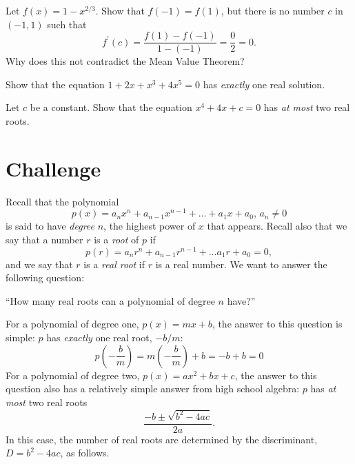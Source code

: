\documentclass[10pt]{amsart}
\begin{document}
\vspace{1.5in}

\begin{thm}
  Let \(f(x) = 1 - x^{2/3}\).
  Show that \(f(-1) = f(1)\), but there is no number \(c\) in \((-1,1)\) such that
  \[f^\prime(c) = \frac{f(1) - f(-1)}{1 - (-1)} = \frac{0}{2} = 0.\]
  Why does this not contradict the Mean Value Theorem?
\end{thm}

\newpage

\begin{thm}
  Show that the equation \(1 + 2x + x^3 + 4x^5 = 0\) has \textit{exactly} one real solution.
\end{thm}

\vspace{4in}

\begin{thm}
  Let \(c\) be a constant.
  Show that the equation \(x^4 + 4x + c = 0\) has \textit{at most} two real roots.
\end{thm}

\newpage

\section*{Challenge}



Recall that the polynomial
\[p(x) = a_n x^n + a_{n-1} x^{n-1} + \ldots + a_1 x + a_0,\, a_n \neq 0\]
is said to have \textit{degree} \(n\), the highest power of \(x\) that appears.
Recall also that we say that a number \(r\) is a \textit{root} of \(p\) if
\[p(r) = a_nr^n + a_{n-1}r^{n-1} + \ldots a_1 r + a_0 = 0,\]
and we say that \(r\) is a \textit{real root} if \(r\) is a real number.
We want to answer the following question:
\begin{displayquote}
  ``How many real roots can a polynomial of degree \(n\) have?''
\end{displayquote}

For a polynomial of degree one, \(p(x) = m x + b\), the answer to this question is simple: \(p\) has \textit{exactly} one real root, \(-b/m\):
\[p\left(-\frac{b}{m}\right) = m\left(-\frac{b}{m}\right) + b = -b + b = 0\]
For a polynomial of degree two, \(p(x) = a x^2 + b x + c\), the answer to this question also has a relatively simple answer from high school algebra: \(p\) has \textit{at most} two real roots
\[\frac{-b \pm \sqrt{b^2 - 4ac}}{2a}.\]
In this case, the number of real roots are determined by the discriminant, \(D = b^2 - 4ac\), as follows.\\
\end{document}
